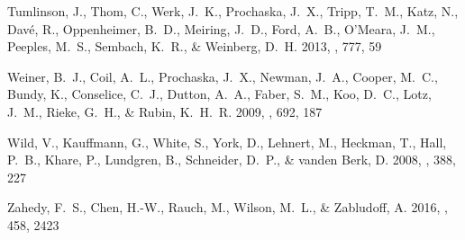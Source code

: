 \documentclass[iop]{emulateapj}
\begin{document}
\begin{thebibliography}{46}
{Tumlinson}, J., {Thom}, C., {Werk}, J.~K., {Prochaska}, J.~X., {Tripp}, T.~M.,
  {Katz}, N., {Dav{\'e}}, R., {Oppenheimer}, B.~D., {Meiring}, J.~D., {Ford},
  A.~B., {O'Meara}, J.~M., {Peeples}, M.~S., {Sembach}, K.~R., \& {Weinberg},
  D.~H. 2013, \apj, 777, 59

{Weiner}, B.~J., {Coil}, A.~L., {Prochaska}, J.~X., {Newman}, J.~A., {Cooper},
  M.~C., {Bundy}, K., {Conselice}, C.~J., {Dutton}, A.~A., {Faber}, S.~M.,
  {Koo}, D.~C., {Lotz}, J.~M., {Rieke}, G.~H., \& {Rubin}, K.~H.~R. 2009, \apj,
  692, 187

{Wild}, V., {Kauffmann}, G., {White}, S., {York}, D., {Lehnert}, M., {Heckman},
  T., {Hall}, P.~B., {Khare}, P., {Lundgren}, B., {Schneider}, D.~P., \&
  {vanden Berk}, D. 2008, \mnras, 388, 227

{Zahedy}, F.~S., {Chen}, H.-W., {Rauch}, M., {Wilson}, M.~L., \& {Zabludoff},
  A. 2016, \mnras, 458, 2423

\end{thebibliography}
\end{document}
